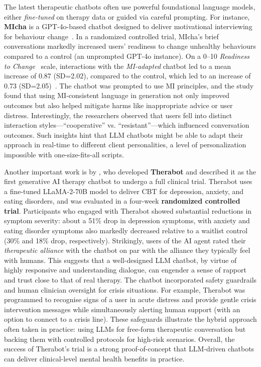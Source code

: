 The latest therapeutic chatbots often use powerful foundational language models, either \emph{fine-tuned} on therapy data or guided via careful prompting. For instance, \textbf{MIcha} is a GPT-4o-based chatbot designed to deliver motivational interviewing for behaviour change~\cite{Meyer2025}. In a randomized controlled trial, MIcha's brief conversations markedly increased users' readiness to change unhealthy behaviours compared to a control (an unprompted GPT-4o instance). On a 0--10 \emph{Readiness to Change}~\cite{BienerAbrams1991} scale, interactions with the \emph{MI-adapted} chatbot led to a mean increase of 0.87 (SD=2.02), compared to the control, which led to an increase of 0.73 (SD=2.05)~\cite{Meyer2025}.
The chatbot was prompted to use MI principles, and the study found that using MI-consistent language in generation not only improved outcomes but also helped mitigate harms like inappropriate advice or user distress. Interestingly, the researchers observed that users fell into distinct interaction styles---``cooperative'' vs. ``resistant''---which influenced conversation outcomes. Such insights hint that LLM chatbots might be able to adapt their approach in real-time to different client personalities, a level of personalization impossible with one-size-fits-all scripts.

Another important work is by \citet{doi:10.1056/AIoa2400802}, who developed \textbf{Therabot} and described it as the first generative AI therapy chatbot to undergo a full clinical trial. Therabot uses a fine-tuned LLaMA-2-70B model to deliver CBT for depression, anxiety, and eating disorders, and was evaluated in a four-week \textbf{randomized controlled trial}. Participants who engaged with Therabot showed substantial reductions in symptom severity: about a 51\% drop in depression symptoms, with anxiety and eating disorder symptoms also markedly decreased relative to a waitlist control (30\% and 18\% drop, respectively). Strikingly, users of the AI agent rated their \emph{therapeutic alliance} with the chatbot on par with the alliance they typically feel with humans. This suggests that a well-designed LLM chatbot, by virtue of highly responsive and understanding dialogue, can engender a sense of rapport and trust close to that of real therapy. The chatbot incorporated safety guardrails and human clinician oversight for crisis situations. For example, Therabot was programmed to recognise signs of a user in acute distress and provide gentle crisis intervention messages while simultaneously alerting human support (with an option to connect to a crisis line). These safeguards illustrate the hybrid approach often taken in practice: using LLMs for free-form therapeutic conversation but backing them with controlled protocols for high-risk scenarios. Overall, the success of Therabot’s trial is a strong proof-of-concept that LLM-driven chatbots can deliver clinical-level mental health benefits in practice.


